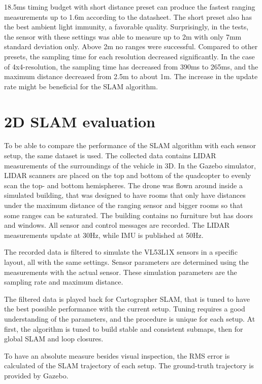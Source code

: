 \documentclass[conference]{IEEEtran}
\begin{document}
18.5ms timing budget with short distance preset can produce the fastest ranging measurements up to 1.6m according
to the datasheet. The short preset also has the best ambient light immunity, a favorable quality. Surprisingly,
in the tests, the sensor with these settings was able to measure up to 2m with only 7mm standard deviation only. 
Above 2m no ranges were successful. Compared to other presets, the sampling time for each resolution decreased
significantly. In the case of 4x4-resolution, the sampling time has decreased from 390ms to 265ms, and the 
maximum distance decreased from 2.5m to about 1m. The increase in the update rate might be beneficial for 
the SLAM algorithm. 

\section{2D SLAM evaluation}

To be able to compare the performance of the SLAM algorithm with each sensor setup, the same dataset 
is used. The collected data contains LIDAR measurements of the surroundings of the vehicle in 3D. In the Gazebo simulator, 
LIDAR scanners are placed on the top and bottom of the quadcopter to evenly scan the top- and bottom 
hemispheres. The drone was flown around inside a simulated building, that was designed to have rooms that only 
have distances under the maximum distance of the ranging sensor and bigger rooms so that some ranges  
can be saturated. The building contains no furniture but has doors and windows. All sensor and control messages are recorded. The LIDAR measurements update at 30Hz, while IMU is published at 50Hz.

The recorded data is filtered to simulate the VL53L1X sensors in a specific layout, all with the same settings. 
Sensor parameters are determined using the measurements with the actual sensor. These simulation parameters are
the sampling rate and maximum distance. 

The filtered data is played back for Cartographer SLAM, that is tuned to have the best possible performance
with the current setup. Tuning requires a good understanding of the parameters, and the procedure is unique for
each setup. At first, the algorithm is tuned to build stable and consistent submaps, then for global SLAM and
loop closures.

To have an absolute measure besides visual inspection, the RMS error is calculated of the SLAM trajectory of 
each setup. The ground-truth trajectory is provided by Gazebo.
 
\end{document}
